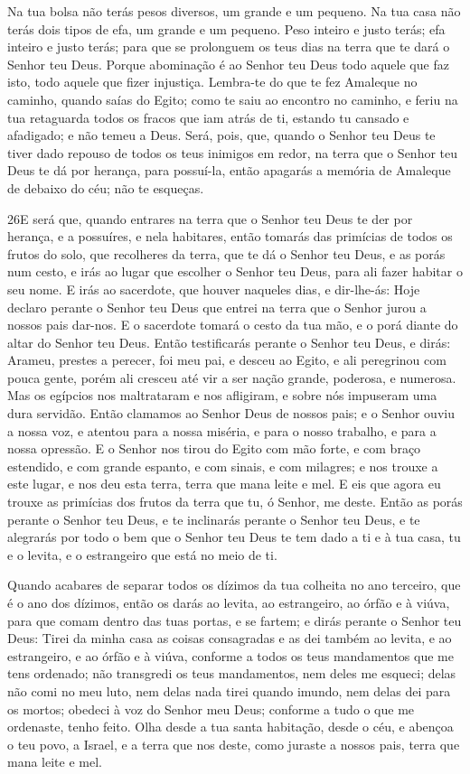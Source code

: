 Na tua bolsa não terás pesos diversos, um grande e um pequeno.
Na tua casa não terás dois tipos de efa, um grande e um
pequeno. Peso inteiro e justo terás; efa inteiro e justo
terás; para que se prolonguem os teus dias na terra que te dará o
Senhor teu Deus. Porque abominação é ao Senhor teu Deus todo
aquele que faz isto, todo aquele que fizer injustiça.
Lembra-te do que te fez Amaleque no caminho, quando saías do
Egito; como te saiu ao encontro no caminho, e feriu na tua
retaguarda todos os fracos que iam atrás de ti, estando tu cansado e
afadigado; e não temeu a Deus. Será, pois, que, quando o
Senhor teu Deus te tiver dado repouso de todos os teus inimigos em
redor, na terra que o Senhor teu Deus te dá por herança, para
possuí-la, então apagarás a memória de Amaleque de debaixo do céu;
não te esqueças.

\medskip

\lettrine{26} E será que, quando entrares na terra que o
Senhor teu Deus te der por herança, e a possuíres, e nela habitares,
então tomarás das primícias de todos os frutos do solo, que
recolheres da terra, que te dá o Senhor teu Deus, e as porás num
cesto, e irás ao lugar que escolher o Senhor teu Deus, para ali
fazer habitar o seu nome. E irás ao sacerdote, que houver
naqueles dias, e dir-lhe-ás: Hoje declaro perante o Senhor teu Deus
que entrei na terra que o Senhor jurou a nossos pais dar-nos. E
o sacerdote tomará o cesto da tua mão, e o porá diante do altar do
Senhor teu Deus. Então testificarás perante o Senhor teu Deus, e
dirás: Arameu, prestes a perecer, foi meu pai, e desceu ao Egito, e
ali peregrinou com pouca gente, porém ali cresceu até vir a ser
nação grande, poderosa, e numerosa. Mas os egípcios nos
maltrataram e nos afligiram, e sobre nós impuseram uma dura
servidão. Então clamamos ao Senhor Deus de nossos pais; e o
Senhor ouviu a nossa voz, e atentou para a nossa miséria, e para o
nosso trabalho, e para a nossa opressão. E o Senhor nos tirou do
Egito com mão forte, e com braço estendido, e com grande espanto, e
com sinais, e com milagres; e nos trouxe a este lugar, e nos deu
esta terra, terra que mana leite e mel. E eis que agora eu
trouxe as primícias dos frutos da terra que tu, ó Senhor, me deste.
Então as porás perante o Senhor teu Deus, e te inclinarás perante o
Senhor teu Deus, e te alegrarás por todo o bem que o Senhor
teu Deus te tem dado a ti e à tua casa, tu e o levita, e o
estrangeiro que está no meio de ti.

Quando acabares de separar todos os dízimos da tua colheita no
ano terceiro, que é o ano dos dízimos, então os darás ao levita, ao
estrangeiro, ao órfão e à viúva, para que comam dentro das tuas
portas, e se fartem; e dirás perante o Senhor teu Deus: Tirei
da minha casa as coisas consagradas e as dei também ao levita, e ao
estrangeiro, e ao órfão e à viúva, conforme a todos os teus
mandamentos que me tens ordenado; não transgredi os teus
mandamentos, nem deles me esqueci; delas não comi no meu
luto, nem delas nada tirei quando imundo, nem delas dei para os
mortos; obedeci à voz do Senhor meu Deus; conforme a tudo o que me
ordenaste, tenho feito. Olha desde a tua santa habitação,
desde o céu, e abençoa o teu povo, a Israel, e a terra que nos
deste, como juraste a nossos pais, terra que mana leite e mel.

